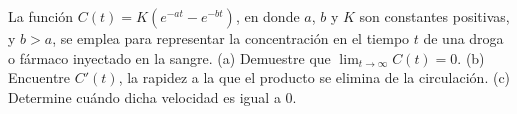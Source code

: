 \item La función $C(t) = K(e^{-at} - e^{-bt})$, en donde $a$, $b$ y $K$ son constantes positivas, y $b > a$, se emplea para representar la concentración en el tiempo $t$ de una droga o fármaco inyectado en la sangre. (a) Demuestre que $\lim_{t \to \infty} C(t) = 0$. (b) Encuentre $C'(t)$, la rapidez a la que el producto se elimina de la circulación. (c) Determine cuándo dicha velocidad es igual a 0.
